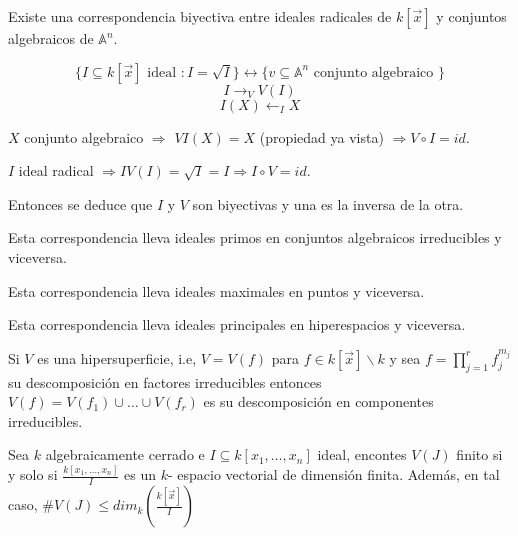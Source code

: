 \begin{Cor}
Existe una correspondencia biyectiva entre ideales radicales de $k[\vec{x}]$ y conjuntos algebraicos de $\mathbb{A}^n$.

$$\{ I\subseteq k[\vec{x}] \text{ ideal } : I=\sqrt{I} \} \leftrightarrow \{v\subseteq \mathbb{A}^n \text{ conjunto algebraico } \}$$
$$ I\rightarrow_V V(I)$$
$$I(X) \leftarrow_I X$$
\end{Cor}

\begin{Dem}
$X$ conjunto algebraico $\Rightarrow $ $VI(X)=X$ (propiedad ya vista) $\Rightarrow V\circ I = id$.

$I$ ideal radical $\Rightarrow IV(I)=\sqrt{I}=I \Rightarrow I\circ V =id$.

Entonces se deduce que $I$ y $V$ son biyectivas y una es la inversa de la otra. 
\end{Dem}

\begin{Cor}
Esta correspondencia lleva ideales primos en conjuntos algebraicos irreducibles y viceversa.
\end{Cor}

\begin{Cor}
Esta correspondencia lleva ideales maximales en puntos y viceversa.
\end{Cor}

\begin{Cor}
Esta correspondencia lleva ideales principales en hiperespacios y viceversa.
\end{Cor}

\begin{Cor}
Si $V$ es una hipersuperficie, i.e, $V=V(f)$ para $f\in k[\vec{x}]\backslash k$ y sea $f=\prod_{j=1}^rf_j^{m_j}$ su descomposición en factores irreducibles entonces $V(f) = V(f_1)\cup \dots \cup V(f_r)$ es su descomposición en componentes irreducibles.
\end{Cor}

\begin{Cor}
Sea $k$ algebraicamente cerrado e $I\subseteq k[x_1,\dots,x_n]$ ideal, encontes $V(J)$ finito si y solo si $\frac{k[x_1,\dots,x_n]}{I}$ es un $k$- espacio vectorial de dimensión finita. Además, en tal caso, $\#V(J) \le dim_k( \frac{k[\vec{x}]}{I})$
\end{Cor}

